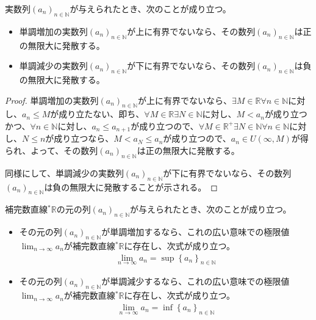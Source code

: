 \documentclass[dvipdfmx]{jsarticle}
\begin{document}
\begin{thm}\label{4.1.4.17}
実数列$\left( a_{n} \right)_{n \in \mathbb{N}}$が与えられたとき、次のことが成り立つ。
\begin{itemize}
\item
  単調増加の実数列$\left( a_{n} \right)_{n \in \mathbb{N}}$が上に有界でないなら、その数列$\left( a_{n} \right)_{n \in \mathbb{N}}$は正の無限大に発散する。
\item
  単調減少の実数列$\left( a_{n} \right)_{n \in \mathbb{N}}$が下に有界でないなら、その数列$\left( a_{n} \right)_{n \in \mathbb{N}}$は負の無限大に発散する。
\end{itemize}
\end{thm}
\begin{proof}
単調増加の実数列$\left( a_{n} \right)_{n \in \mathbb{N}}$が上に有界でないなら、$\exists M \in \mathbb{R}\forall n \in \mathbb{N}$に対し、$a_{n} \leq M$が成り立たない、即ち、$\forall M \in \mathbb{R}\exists N \in \mathbb{N}$に対し、$M < a_{n}$が成り立つかつ、$\forall n \in \mathbb{N}$に対し、$a_{n} \leq a_{n + 1}$が成り立つので、$\forall M \in \mathbb{R}^{+}\exists N \in \mathbb{N}\forall n \in \mathbb{N}$に対し、$N \leq n$が成り立つなら、$M < a_{N} \leq a_{n}$が成り立つので、$a_{n} \in U(\infty,M)$が得られ、よって、その数列$\left( a_{n} \right)_{n \in \mathbb{N}}$は正の無限大に発散する。\par
同様にして、単調減少の実数列$\left( a_{n} \right)_{n \in \mathbb{N}}$が下に有界でないなら、その数列$\left( a_{n} \right)_{n \in \mathbb{N}}$は負の無限大に発散することが示される。
\end{proof}
\begin{thm}\label{4.1.4.18}
補完数直線${}^{*}\mathbb{R}$の元の列$\left( a_{n} \right)_{n \in \mathbb{N}}$が与えられたとき、次のことが成り立つ。
\begin{itemize}
\item
  その元の列$\left( a_{n} \right)_{n \in \mathbb{N}}$が単調増加するなら、これの広い意味での極限値$\lim_{n \rightarrow \infty}a_{n}$が補完数直線${}^{*}\mathbb{R}$に存在し、次式が成り立つ。
\begin{align*}
\lim_{n \rightarrow \infty}a_{n} = \sup\left\{ a_{n} \right\}_{n \in \mathbb{N}}
\end{align*}
\item
  その元の列$\left( a_{n} \right)_{n \in \mathbb{N}}$が単調減少するなら、これの広い意味での極限値$\lim_{n \rightarrow \infty}a_{n}$が補完数直線${}^{*}\mathbb{R}$に存在し、次式が成り立つ。
\begin{align*}
\lim_{n \rightarrow \infty}a_{n} = \inf\left\{ a_{n} \right\}_{n \in \mathbb{N}}
\end{align*}
\end{itemize}
\end{thm}
\end{document}
